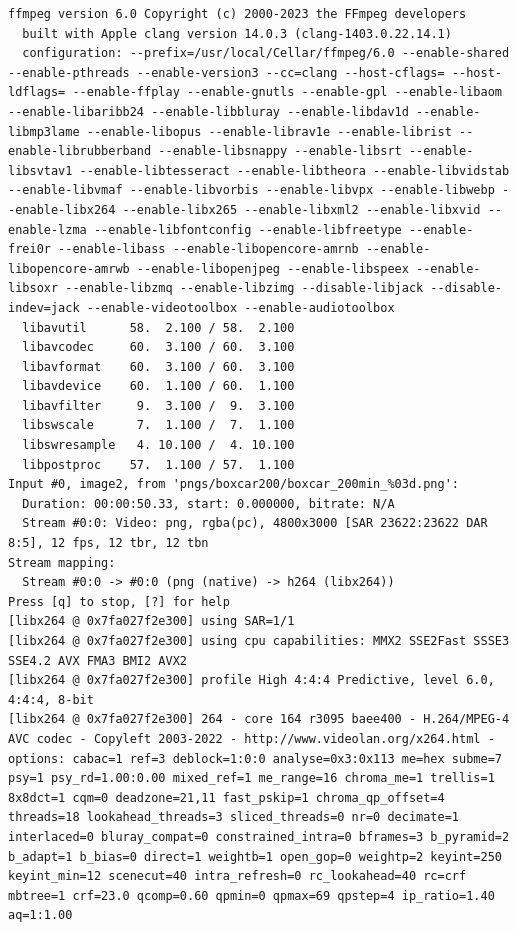 \documentclass[
  letterpaper,
  DIV=11,
  numbers=noendperiod,
  oneside]{scrreprt}
\begin{document}
\begin{verbatim}
ffmpeg version 6.0 Copyright (c) 2000-2023 the FFmpeg developers
  built with Apple clang version 14.0.3 (clang-1403.0.22.14.1)
  configuration: --prefix=/usr/local/Cellar/ffmpeg/6.0 --enable-shared --enable-pthreads --enable-version3 --cc=clang --host-cflags= --host-ldflags= --enable-ffplay --enable-gnutls --enable-gpl --enable-libaom --enable-libaribb24 --enable-libbluray --enable-libdav1d --enable-libmp3lame --enable-libopus --enable-librav1e --enable-librist --enable-librubberband --enable-libsnappy --enable-libsrt --enable-libsvtav1 --enable-libtesseract --enable-libtheora --enable-libvidstab --enable-libvmaf --enable-libvorbis --enable-libvpx --enable-libwebp --enable-libx264 --enable-libx265 --enable-libxml2 --enable-libxvid --enable-lzma --enable-libfontconfig --enable-libfreetype --enable-frei0r --enable-libass --enable-libopencore-amrnb --enable-libopencore-amrwb --enable-libopenjpeg --enable-libspeex --enable-libsoxr --enable-libzmq --enable-libzimg --disable-libjack --disable-indev=jack --enable-videotoolbox --enable-audiotoolbox
  libavutil      58.  2.100 / 58.  2.100
  libavcodec     60.  3.100 / 60.  3.100
  libavformat    60.  3.100 / 60.  3.100
  libavdevice    60.  1.100 / 60.  1.100
  libavfilter     9.  3.100 /  9.  3.100
  libswscale      7.  1.100 /  7.  1.100
  libswresample   4. 10.100 /  4. 10.100
  libpostproc    57.  1.100 / 57.  1.100
Input #0, image2, from 'pngs/boxcar200/boxcar_200min_%03d.png':
  Duration: 00:00:50.33, start: 0.000000, bitrate: N/A
  Stream #0:0: Video: png, rgba(pc), 4800x3000 [SAR 23622:23622 DAR 8:5], 12 fps, 12 tbr, 12 tbn
Stream mapping:
  Stream #0:0 -> #0:0 (png (native) -> h264 (libx264))
Press [q] to stop, [?] for help
[libx264 @ 0x7fa027f2e300] using SAR=1/1
[libx264 @ 0x7fa027f2e300] using cpu capabilities: MMX2 SSE2Fast SSSE3 SSE4.2 AVX FMA3 BMI2 AVX2
[libx264 @ 0x7fa027f2e300] profile High 4:4:4 Predictive, level 6.0, 4:4:4, 8-bit
[libx264 @ 0x7fa027f2e300] 264 - core 164 r3095 baee400 - H.264/MPEG-4 AVC codec - Copyleft 2003-2022 - http://www.videolan.org/x264.html - options: cabac=1 ref=3 deblock=1:0:0 analyse=0x3:0x113 me=hex subme=7 psy=1 psy_rd=1.00:0.00 mixed_ref=1 me_range=16 chroma_me=1 trellis=1 8x8dct=1 cqm=0 deadzone=21,11 fast_pskip=1 chroma_qp_offset=4 threads=18 lookahead_threads=3 sliced_threads=0 nr=0 decimate=1 interlaced=0 bluray_compat=0 constrained_intra=0 bframes=3 b_pyramid=2 b_adapt=1 b_bias=0 direct=1 weightb=1 open_gop=0 weightp=2 keyint=250 keyint_min=12 scenecut=40 intra_refresh=0 rc_lookahead=40 rc=crf mbtree=1 crf=23.0 qcomp=0.60 qpmin=0 qpmax=69 qpstep=4 ip_ratio=1.40 aq=1:1.00

\end{verbatim}
\end{document}
